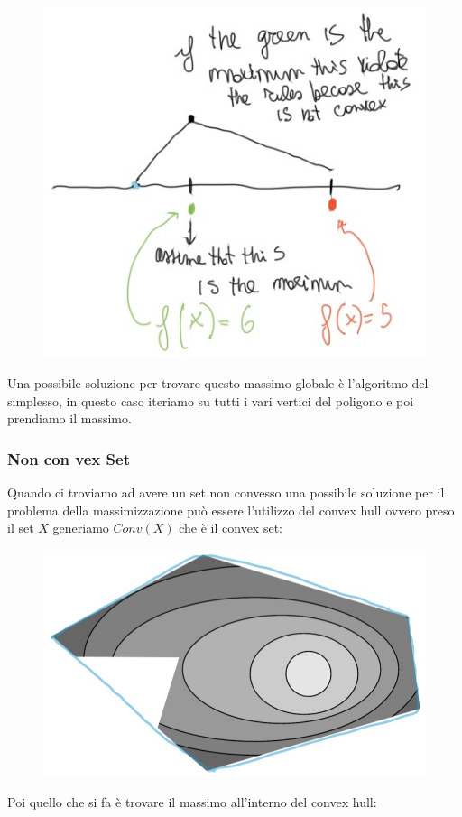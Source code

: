 \documentclass[14pt]{extreport}
\begin{document}
\begin{figure}[H]
\centering
\includegraphics[width=0.7\linewidth]{231.jpeg}
\end{figure}

Una possibile soluzione per trovare questo massimo globale è l'algoritmo del simplesso, in questo caso iteriamo su tutti i vari vertici del poligono e
poi prendiamo il massimo.

\subsubsection{Non con	vex Set}

Quando ci troviamo ad avere un set non convesso una possibile soluzione per il problema della massimizzazione può essere l'utilizzo del convex hull
ovvero preso il set $X$ generiamo $Conv(X)$ che è il convex set:

\begin{figure}[H]
\centering
\includegraphics[width=0.7\linewidth]{232.jpeg}
\end{figure}

Poi quello che si fa è trovare il massimo all'interno del convex hull:
\end{document}
